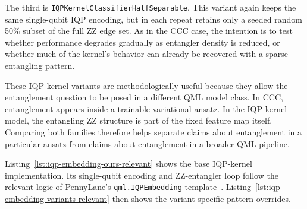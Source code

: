 \documentclass[12pt,a4paper,openany]{report}
\let\parencite\citep
\begin{document}
The third is \texttt{IQPKernelClassifierHalfSeparable}. This variant again keeps the same single-qubit IQP encoding, but in each repeat retains only a seeded random 50\% subset of the full ZZ edge set. As in the CCC case, the intention is to test whether performance degrades gradually as entangler density is reduced, or whether much of the kernel's behavior can already be recovered with a sparse entangling pattern.

These IQP-kernel variants are methodologically useful because they allow the entanglement question to be posed in a different QML model class. In CCC, entanglement appears inside a trainable variational ansatz. In the IQP-kernel model, the entangling ZZ structure is part of the fixed feature map itself. Comparing both families therefore helps separate claims about entanglement in a particular ansatz from claims about entanglement in a broader QML pipeline.

Listing~\ref{lst:iqp-embedding-ours-relevant} shows the base IQP-kernel implementation. Its single-qubit encoding and ZZ-entangler loop follow the relevant logic of PennyLane's \texttt{qml.IQPEmbedding} template~\parencite{pennylane_iqp_embedding}. Listing~\ref{lst:iqp-embedding-variants-relevant} then shows the variant-specific pattern overrides.
\end{document}

